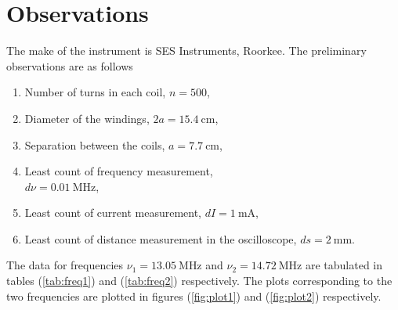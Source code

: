\documentclass[%
 reprint,
nofootinbib,
 amsmath,amssymb,
 aps,
floatfix,
]{revtex4-2}
\begin{document}
    
\section{Observations}
    The make of the instrument is SES Instruments, Roorkee. The preliminary observations are as follows
    \begin{enumerate}
        \item Number of turns in each coil, $n = 500$,
        \item Diameter of the windings, $2a = \SI{15.4}{\centi \metre}$,
        \item Separation between the coils, $a = \SI{7.7}{\centi \metre}$,
        \item Least count of frequency measurement, \\ $d \nu = \SI{0.01}{\mega \hertz}$, 
        \item Least count of current measurement, $dI = \SI{1}{\milli \ampere}$, 
        \item Least count of distance measurement in the oscilloscope, $ds = \SI{2}{\milli \metre}$.
    \end{enumerate}
    The data for frequencies $\nu_1 = \SI{13.05}{\mega \hertz}$ and $\nu_2 = \SI{14.72}{\mega \hertz}$ are tabulated in tables (\ref{tab:freq1}) and (\ref{tab:freq2}) respectively. The plots corresponding to the two frequencies are plotted in figures (\ref{fig:plot1}) and (\ref{fig:plot2}) respectively.
\end{document}

